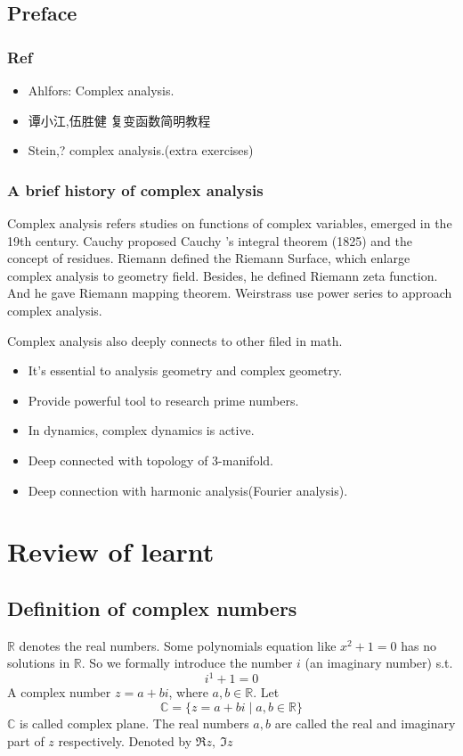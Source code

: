 \documentclass{book}
\begin{document}
\tableofcontents
\chapter{Preface}
\section{Ref}
\begin{itemize}
    \item Ahlfors: Complex analysis.
    \item 谭小江,伍胜健 复变函数简明教程
    \item Stein,? complex analysis.(extra exercises)
\end{itemize}
\section{A brief history of complex analysis}
Complex analysis refers studies on functions of complex variables, emerged in the 19th century. Cauchy proposed Cauchy 's integral theorem (1825) and the concept of residues. Riemann defined the Riemann Surface, which enlarge complex analysis to geometry field. Besides, he defined Riemann zeta function. And he gave Riemann mapping theorem. Weirstrass use power series to approach complex analysis.

Complex analysis also deeply connects to other filed in math.
\begin{itemize}
    \item It's essential to analysis geometry and complex geometry.
    \item Provide powerful tool to research prime numbers.
    \item In dynamics, complex dynamics is active.
    \item Deep connected with topology of 3-manifold.
    \item Deep connection with harmonic analysis(Fourier analysis).
\end{itemize}
\part{Review of learnt}
\chapter{Definition of complex numbers}
$\mathbb{R}$ denotes the real numbers. Some polynomials equation like $x^2+1=0$ has no solutions in $\mathbb{R}$. So we formally introduce the number $i$ (an imaginary number) s.t.$$i^1+1=0$$
A complex number $z=a+bi$, where $a,b\in \mathbb{R}$. Let $$\mathbb C=\{z=a+bi\mid a,b\in \mathbb R\}$$ 
$\mathbb C$ is called complex plane. The real numbers $a,b$ are called the real and imaginary part of $z$ respectively. Denoted by $\Re z,\ \Im z$
\end{document}
